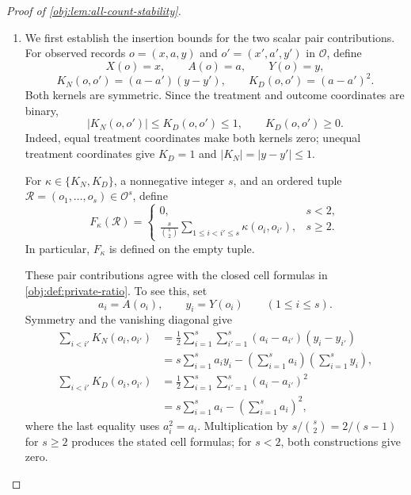 \documentclass[11pt]{article}
\begin{document}
\begin{proof}[Proof of \cref{obj:lem:all-count-stability}]
\begin{enumerate}
\item We first establish the insertion bounds for the two scalar pair contributions. For observed records \(o=(x,a,y)\) and \(o'=(x',a',y')\) in \(\mathcal O\), define
\[
X(o)=x,\qquad A(o)=a,\qquad Y(o)=y,
\]
\[
K_N(o,o')=(a-a')(y-y'),
\qquad
K_D(o,o')=(a-a')^2.
\]
Both kernels are symmetric. Since the treatment and outcome coordinates are binary,
\[
|K_N(o,o')|\le K_D(o,o')\le1,
\qquad
K_D(o,o')\ge0.
\]
Indeed, equal treatment coordinates make both kernels zero; unequal treatment coordinates give \(K_D=1\) and \(|K_N|=|y-y'|\le1\).

For \(\kappa\in\{K_N,K_D\}\), a nonnegative integer \(s\), and an ordered tuple \(\mathscr R=(o_1,\ldots,o_s)\in\mathcal O^s\), define
\[
F_\kappa(\mathscr R)=
\begin{cases}
0,&s<2,\\[2pt]
\displaystyle\frac{s}{\binom{s}{2}}
\sum_{1\le i<i'\le s}\kappa(o_i,o_{i'}),&s\ge2.
\end{cases}
\]
In particular, \(F_\kappa\) is defined on the empty tuple.

These pair contributions agree with the closed cell formulas in \cref{obj:def:private-ratio}. To see this, set
\[
a_i=A(o_i),\qquad y_i=Y(o_i)\qquad(1\le i\le s).
\]
Symmetry and the vanishing diagonal give
\[
\begin{aligned}
\sum_{i<i'}K_N(o_i,o_{i'})
&=\frac12\sum_{i=1}^s\sum_{i'=1}^s
(a_i-a_{i'})(y_i-y_{i'})\\
&=s\sum_{i=1}^s a_i y_i
-\left(\sum_{i=1}^s a_i\right)
 \left(\sum_{i=1}^s y_i\right),\\
\sum_{i<i'}K_D(o_i,o_{i'})
&=\frac12\sum_{i=1}^s\sum_{i'=1}^s(a_i-a_{i'})^2\\
&=s\sum_{i=1}^s a_i-\left(\sum_{i=1}^s a_i\right)^2,
\end{aligned}
\]
where the last equality uses \(a_i^2=a_i\). Multiplication by
\(s/\binom{s}{2}=2/(s-1)\) for \(s\ge2\) produces the stated cell formulas; for \(s<2\), both constructions give zero.


\end{enumerate}
\end{proof}
\end{document}
